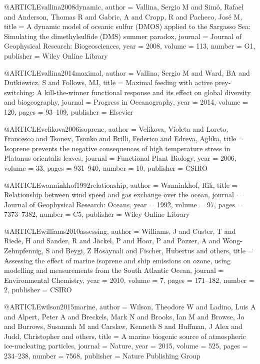 @ARTICLE{vallina2008dynamic,
  author = {Vallina, Sergio M and Sim{\'o}, Rafael and Anderson, Thomas R and
	Gabric, A and Cropp, R and Pacheco, Jos{\'e} M},
  title = {A dynamic model of oceanic sulfur (DMOS) applied to the Sargasso
	Sea: Simulating the dimethylsulfide (DMS) summer paradox},
  journal = {Journal of Geophysical Research: Biogeosciences},
  year = {2008},
  volume = {113},
  number = {G1},
  publisher = {Wiley Online Library}
}

@ARTICLE{vallina2014maximal,
  author = {Vallina, Sergio M and Ward, BA and Dutkiewicz, S and Follows, MJ},
  title = {Maximal feeding with active prey-switching: A kill-the-winner functional
	response and its effect on global diversity and biogeography},
  journal = {Progress in Oceanography},
  year = {2014},
  volume = {120},
  pages = {93--109},
  publisher = {Elsevier}
}

@ARTICLE{velikova2006isoprene,
  author = {Velikova, Violeta and Loreto, Francesco and Tsonev, Tsonko and Brilli,
	Federico and Edreva, Aglika},
  title = {Isoprene prevents the negative consequences of high temperature stress
	in Platanus orientalis leaves},
  journal = {Functional Plant Biology},
  year = {2006},
  volume = {33},
  pages = {931--940},
  number = {10},
  publisher = {CSIRO}
}

@ARTICLE{wanninkhof1992relationship,
  author = {Wanninkhof, Rik},
  title = {Relationship between wind speed and gas exchange over the ocean},
  journal = {Journal of Geophysical Research: Oceans},
  year = {1992},
  volume = {97},
  pages = {7373--7382},
  number = {C5},
  publisher = {Wiley Online Library}
}

@ARTICLE{williams2010assessing,
  author = {Williams, J and Custer, T and Riede, H and Sander, R and J{\"o}ckel,
	P and Hoor, P and Pozzer, A and Wong-Zehnpfennig, S and Beygi, Z
	Hosaynali and Fischer, Hubertus and others},
  title = {Assessing the effect of marine isoprene and ship emissions on ozone,
	using modelling and measurements from the South Atlantic Ocean},
  journal = {Environmental Chemistry},
  year = {2010},
  volume = {7},
  pages = {171--182},
  number = {2},
  publisher = {CSIRO}
}

@ARTICLE{wilson2015marine,
  author = {Wilson, Theodore W and Ladino, Luis A and Alpert, Peter A and Breckels,
	Mark N and Brooks, Ian M and Browse, Jo and Burrows, Susannah M and
	Carslaw, Kenneth S and Huffman, J Alex and Judd, Christopher and
	others},
  title = {A marine biogenic source of atmospheric ice-nucleating particles},
  journal = {Nature},
  year = {2015},
  volume = {525},
  pages = {234--238},
  number = {7568},
  publisher = {Nature Publishing Group}
}

